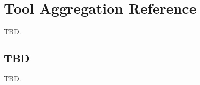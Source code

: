 \chapter{Tool Aggregation Reference}
\label{ctar2}

TBD.


\section{TBD}
\label{ctar2:stdd0}

TBD.



